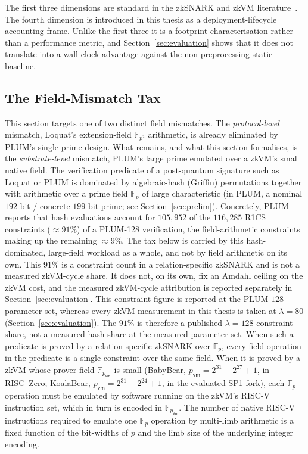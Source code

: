 The first three dimensions are standard in the zkSNARK and zkVM literature~\cite{cryptoeprint:2024/868,10.1007/978-981-95-2961-2_6,bruestle2023risczero,succinct2024sp1,cryptoeprint:2023/1217}. The fourth dimension is introduced in this thesis as a deployment-lifecycle accounting frame. Unlike the first three it is a footprint characterisation rather than a performance metric, and Section~\ref{sec:evaluation} shows that it does not translate into a wall-clock advantage against the non-preprocessing static baseline.

\subsection{The Field-Mismatch Tax}\label{ssec:field-mismatch-tax}
This section targets one of two distinct field mismatches. The \emph{protocol-level} mismatch, Loquat's extension-field $\mathbb{F}_{p^2}$ arithmetic, is already eliminated by PLUM's single-prime design. What remains, and what this section formalises, is the \emph{substrate-level} mismatch, PLUM's large prime emulated over a zkVM's small native field. The verification predicate of a post-quantum signature such as Loquat or PLUM is dominated by algebraic-hash (Griffin) permutations together with arithmetic over a prime field $\mathbb{F}_p$ of large characteristic (in PLUM, a nominal $192$-bit / concrete $199$-bit prime; see Section~\ref{sec:prelim}). Concretely, PLUM~\cite[\S4.2]{10.1007/978-981-95-2961-2_6} reports that hash evaluations account for $105{,}952$ of the $116{,}285$ R1CS constraints ($\approx 91\%$) of a PLUM-128 verification, the field-arithmetic constraints making up the remaining $\approx 9\%$. The tax below is carried by this hash-dominated, large-field workload as a whole, and not by field arithmetic on its own. This $91\%$ is a constraint count in a relation-specific zkSNARK and is not a measured zkVM-cycle share. It does not, on its own, fix an Amdahl ceiling on the zkVM cost, and the measured zkVM-cycle attribution is reported separately in Section~\ref{sec:evaluation}. This constraint figure is reported at the PLUM-$128$ parameter set, whereas every zkVM measurement in this thesis is taken at $\lambda=80$ (Section~\ref{sec:evaluation}). The $91\%$ is therefore a published $\lambda=128$ constraint share, not a measured hash share at the measured parameter set. When such a predicate is proved by a relation-specific zkSNARK over $\mathbb{F}_p$, every field operation in the predicate is a single constraint over the same field. When it is proved by a zkVM whose prover field $\mathbb{F}_{p_{\mathsf{vm}}}$ is small (BabyBear, $p_{\mathsf{vm}} = 2^{31} - 2^{27} + 1$, in RISC~Zero; KoalaBear, $p_{\mathsf{vm}} = 2^{31} - 2^{24} + 1$, in the evaluated SP1 fork), each $\mathbb{F}_p$ operation must be emulated by software running on the zkVM's RISC-V instruction set, which in turn is encoded in $\mathbb{F}_{p_{\mathsf{vm}}}$. The number of native RISC-V instructions required to emulate one $\mathbb{F}_p$ operation by multi-limb arithmetic is a fixed function of the bit-widths of $p$ and the limb size of the underlying integer encoding.

